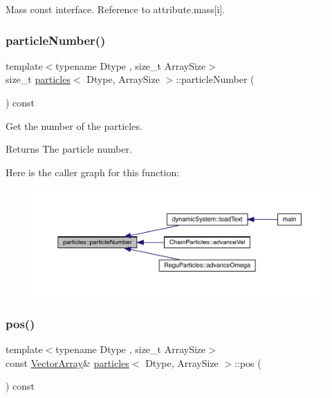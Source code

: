 Mass const interface. Reference to attribute.\+mass\mbox{[}i\mbox{]}. 

\mbox{\label{classparticles_ad164b86b435051fc2f452d07715d0af7}} 
\subsubsection{\texorpdfstring{particle\+Number()}{particleNumber()}}
{\footnotesize\ttfamily template$<$typename Dtype , size\+\_\+t Array\+Size$>$ \\
size\+\_\+t \mbox{\hyperlink{classparticles}{particles}}$<$ Dtype, Array\+Size $>$\+::particle\+Number (\begin{DoxyParamCaption}{ }\end{DoxyParamCaption}) const\hspace{0.3cm}{\ttfamily [inline]}}



Get the number of the particles. 

\begin{DoxyReturn}{Returns}
The particle number. 
\end{DoxyReturn}
Here is the caller graph for this function\+:
\nopagebreak
\begin{figure}[H]
\begin{center}
\leavevmode
\includegraphics[width=350pt]{classparticles_ad164b86b435051fc2f452d07715d0af7_icgraph}
\end{center}
\end{figure}
\mbox{\label{classparticles_a746aa73a995101af269d0a64c76319a2}} 
\subsubsection{\texorpdfstring{pos()}{pos()}\hspace{0.1cm}{\footnotesize\ttfamily [1/2]}}
{\footnotesize\ttfamily template$<$typename Dtype , size\+\_\+t Array\+Size$>$ \\
const \mbox{\hyperlink{classparticles_ac5dddc8c666e4f7057b5109f95926363}{Vector\+Array}}\& \mbox{\hyperlink{classparticles}{particles}}$<$ Dtype, Array\+Size $>$\+::pos (\begin{DoxyParamCaption}{ }\end{DoxyParamCaption}) const\hspace{0.3cm}{\ttfamily [inline]}}



